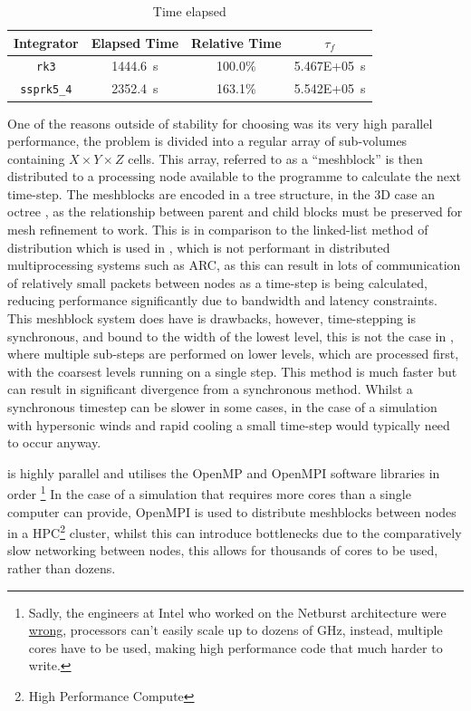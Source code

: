 \begin{table}[h]
  \centering
  \begin{tabular}{cccc}
  \hline
  Integrator & Elapsed Time & Relative Time & $\tau_f$ \\ \hline
  \texttt{rk3}       & \SI{1444.6}{\second} & 100.0\% & \SI{5.467E+05}{\second}\\
  \texttt{ssprk5\_4} & \SI{2352.4}{\second} & 163.1\% & \SI{5.542E+05}{\second}\\ \hline
  \end{tabular}
  \caption{Time elapsed}
  \label{tab:rkssprkcomparison}
\end{table}



One of the reasons outside of stability for choosing \athena{} was its very high parallel performance, the problem is divided into a regular array of sub-volumes containing $X \times Y \times Z$ cells.
This array, referred to as a ``meshblock'' is then distributed to a processing node available to the programme to calculate the next time-step.
The meshblocks are encoded in a tree structure, in the 3D case an octree \parencite{stoneAthenaAdaptiveMesh2020}, as the relationship between parent and child blocks must be preserved for mesh refinement to work.
This is in comparison to the linked-list method of distribution which is used in \mg{}, which is not performant in distributed multiprocessing systems such as ARC, as this can result in lots of communication of relatively small packets between nodes as a time-step is being calculated, reducing performance significantly due to bandwidth and latency constraints.
This meshblock system does have is drawbacks, however, time-stepping is synchronous, and bound to the width of the lowest level, this is not the case in \mg{}, where multiple sub-steps are performed on lower levels, which are processed first, with the coarsest levels running on a single step.
This method is much faster but can result in significant divergence from a synchronous method.
Whilst a synchronous timestep can be slower in some cases, in the case of a simulation with hypersonic winds and rapid cooling a small time-step would typically need to occur anyway.


\athena{} is highly parallel and utilises the OpenMP and OpenMPI software libraries in order \footnote{Sadly, the engineers at Intel who worked on the Netburst architecture were \href{https://web.archive.org/web/20210412001459/https://www.anandtech.com/show/680/6}{wrong}, processors can't easily scale up to dozens of \si{\giga\hertz}, instead, multiple cores have to be used, making high performance code that much harder to write.}
In the case of a simulation that requires more cores than a single computer can provide, OpenMPI is used to distribute meshblocks between nodes in a HPC\footnote{High Performance Compute} cluster, whilst this can introduce bottlenecks due to the comparatively slow networking between nodes, this allows for thousands of cores to be used, rather than dozens.

